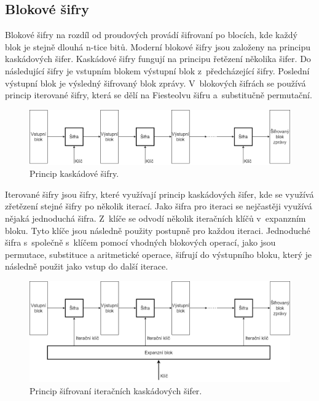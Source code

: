 \subsection{Blokové šifry \label{subsec:blockFunction}}%
Blokové šifry na rozdíl od proudových provádí šifrovaní po blocích, kde každý blok je stejně dlouhá n-tice bitů. Moderní blokové šifry jsou založeny na principu kaskádových šifer. Kaskádové šifry fungují na principu řetězení několika šifer. Do následující šifry je vstupním blokem výstupní blok z~předcházející šifry. Poslední výstupní blok je výsledný šifrovaný blok zprávy. V~blokových šifrách se používá princip iterované šifry, která se dělí na Fiesteolvu šifru a~substitučně permutační.\cite{Burda9788021446120ISBN}
\begin{figure}[!h]
  \begin{center}
    \includegraphics[scale=0.3]{obrazky/cascadeCipher.png}
  \end{center}
  \caption[Kaskádová šifra]{Princip kaskádové šifry.\cite{Burda9788021446120ISBN}}
  \label{img:CascadeCipher}
\end{figure}

Iterované šifry jsou šifry, které využívají princip kaskádových šifer, kde se využívá zřetězení stejné šifry po několik iterací. Jako šifra pro iteraci se nejčastěji využívá nějaká jednoduchá šifra. Z~klíče se odvodí několik iteračních klíčů v~expanzním bloku. Tyto klíče jsou následně použity postupně pro každou iteraci. Jednoduché šifra s~společně s~klíčem pomocí vhodných blokových operací, jako jsou permutace, substituce a aritmetické operace, šifrují do výstupního bloku, který je následně použit jako vstup do další iterace.\cite{Burda9788021446120ISBN}
\begin{figure}[!h]
  \begin{center}
    \includegraphics[scale=0.3]{obrazky/IterateCipher.png}
  \end{center}
  \caption[Iterační kaskádová šifra]{Princip šifrovaní iteračních kaskádových šifer.\cite{Burda9788021446120ISBN}}
  \label{img:iterateCipher}
\end{figure}

